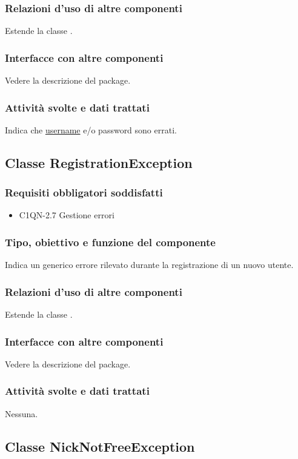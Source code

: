 \subsubsection*{Relazioni d'uso di altre componenti}
Estende la classe .
\subsubsection*{Interfacce con altre componenti}
Vedere la descrizione del package.
\subsubsection*{Attivit\`a svolte e dati trattati}
Indica che \underline{username} e/o password sono errati.

\subsection{Classe RegistrationException}
\subsubsection*{Requisiti obbligatori soddisfatti}
\begin{itemize}
	\item C1QN-2.7 Gestione errori
\end{itemize}
\subsubsection*{Tipo, obiettivo e funzione del componente}
Indica un generico errore rilevato durante la registrazione di un nuovo utente.
\subsubsection*{Relazioni d'uso di altre componenti}
Estende la classe .
\subsubsection*{Interfacce con altre componenti}
Vedere la descrizione del package.
\subsubsection*{Attivit\`a svolte e dati trattati}
Nessuna.

\subsection{Classe NickNotFreeException}

